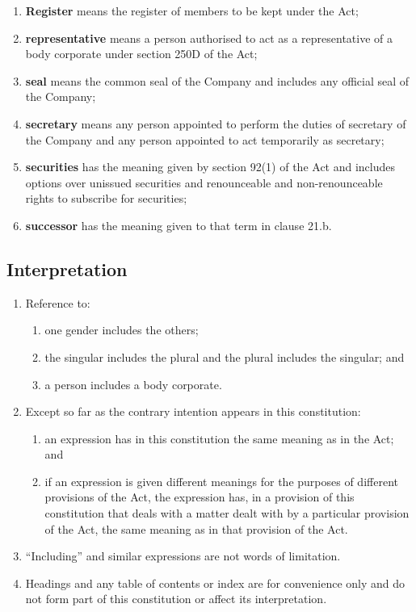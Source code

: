 \begin{enumerate}[label=(\roman*)]
    \item \textbf{Register} means the register of members to be kept under the Act;
    
    \item \textbf{representative} means a person authorised to act as a representative of a body corporate under section 250D of the Act;
    
    \item \textbf{seal} means the common seal of the Company and includes any official seal of the Company;
    
    \item \textbf{secretary} means any person appointed to perform the duties of secretary of the Company and any person appointed to act temporarily as secretary;
    
    \item \textbf{securities} has the meaning given by section 92(1) of the Act and includes options over unissued securities and renounceable and non-renounceable rights to subscribe for securities;
    
    \item \textbf{successor} has the meaning given to that term in clause 21.b.
\end{enumerate}

\subsection{Interpretation}

\begin{enumerate}[label=(\roman*)]
    \item Reference to:
    \begin{enumerate}[label=(\alph*)]
        \item one gender includes the others;
        \item the singular includes the plural and the plural includes the singular; and
        \item a person includes a body corporate.
    \end{enumerate}
    
    \item Except so far as the contrary intention appears in this constitution:
    \begin{enumerate}[label=(\alph*)]
        \item an expression has in this constitution the same meaning as in the Act; and
        \item if an expression is given different meanings for the purposes of different provisions of the Act, the expression has, in a provision of this constitution that deals with a matter dealt with by a particular provision of the Act, the same meaning as in that provision of the Act.
    \end{enumerate}
    
    \item ``Including'' and similar expressions are not words of limitation.
    
    \item Headings and any table of contents or index are for convenience only and do not form part of this constitution or affect its interpretation.
\end{enumerate} 